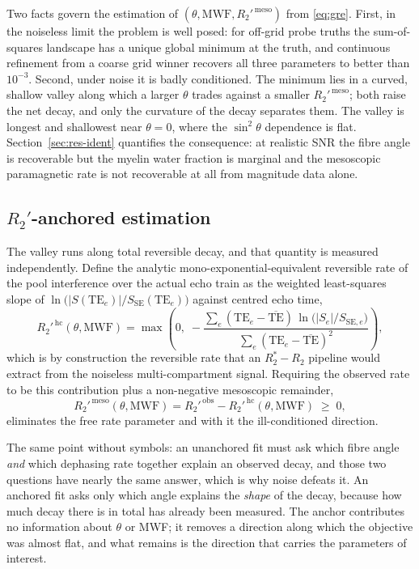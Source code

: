 \documentclass[AMA,STIX2COL,Linenumberson]{MRM}
\begin{document}
Two facts govern the estimation of $(\theta,\mathrm{MWF},R_2'^{\,\mathrm{meso}})$ from \eqref{eq:gre}. First, in the noiseless limit the problem is well posed: for off-grid probe truths the sum-of-squares landscape has a unique global minimum at the truth, and continuous refinement from a coarse grid winner recovers all three parameters to better than $10^{-3}$. Second, under noise it is badly conditioned. The minimum lies in a curved, shallow valley along which a larger $\theta$ trades against a smaller $R_2'^{\,\mathrm{meso}}$; both raise the net decay, and only the curvature of the decay separates them. The valley is longest and shallowest near $\theta=0$, where the $\sin^2\theta$ dependence is flat. Section~\ref{sec:res-ident} quantifies the consequence: at realistic SNR the fibre angle is recoverable but the myelin water fraction is marginal and the mesoscopic paramagnetic rate is not recoverable at all from magnitude data alone.

\subsection{$R_2'$-anchored estimation}
\label{sec:theory-anchor}

The valley runs along total reversible decay, and that quantity is measured independently. Define the analytic mono-exponential-equivalent reversible rate of the pool interference over the actual echo train as the weighted least-squares slope of $\ln\big(|S(\mathrm{TE}_e)|/S_{\mathrm{SE}}(\mathrm{TE}_e)\big)$ against centred echo time,
\begin{equation}
R_2'^{\,\mathrm{hc}}(\theta,\mathrm{MWF}) = \max\!\left(0,\;
-\frac{\sum_e (\mathrm{TE}_e-\overline{\mathrm{TE}})\,\ln\!\big(|S_e|/S_{\mathrm{SE},e}\big)}
{\sum_e (\mathrm{TE}_e-\overline{\mathrm{TE}})^{2}}\right),
\label{eq:r2hc}
\end{equation}
which is by construction the reversible rate that an $R_2^{*}-R_2$ pipeline would extract from the noiseless multi-compartment signal. Requiring the observed rate to be this contribution plus a non-negative mesoscopic remainder,
\begin{equation}
R_2'^{\,\mathrm{meso}}(\theta,\mathrm{MWF}) = R_2'^{\,\mathrm{obs}} - R_2'^{\,\mathrm{hc}}(\theta,\mathrm{MWF}) \;\ge\; 0,
\label{eq:anchor}
\end{equation}
eliminates the free rate parameter and with it the ill-conditioned direction.

The same point without symbols: an unanchored fit must ask which fibre angle \emph{and} which dephasing rate together explain an observed decay, and those two questions have nearly the same answer, which is why noise defeats it. An anchored fit asks only which angle explains the \emph{shape} of the decay, because how much decay there is in total has already been measured. The anchor contributes no information about $\theta$ or MWF; it removes a direction along which the objective was almost flat, and what remains is the direction that carries the parameters of interest.
\end{document}
